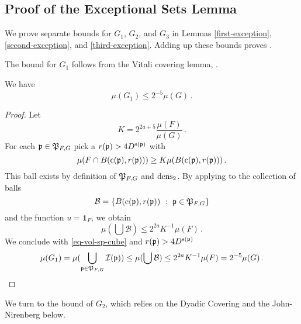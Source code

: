 \subsection{Proof of the Exceptional Sets Lemma}
\label{subsetexcset}


We prove separate bounds for $G_1$, $G_2$, and $G_3$
in Lemmas \ref{first-exception},
\ref{second-exception}, and \ref{third-exception}. Adding up these bounds proves .

The bound for $G_1$ follows from the Vitali covering lemma, .

\begin{lemma}
    \label{first-exception}
    \leanok
    We have
    \begin{equation}
        \mu(G_1)\le 2^{-5}\mu(G)\, .
    \end{equation}
\end{lemma}
\begin{proof}
    \leanok
    Let
    $$
        K = 2^{2a+5}\frac{\mu(F)}{\mu(G)}\,.
    $$
    For each ${\mathfrak p}\in {\mathfrak P}_{F,G}$ pick a
    $r({\mathfrak p})>4D^{{\mathrm{s}}({\mathfrak p})}$ with
    $$
    {\mu(F\cap B({\mathrm{c}}({\mathfrak p}),r({\mathfrak p})))}\ge K{\mu(B({\mathrm{c}}({\mathfrak p}),r({\mathfrak p})))}\, .
    $$
    This ball exists by definition of ${\mathfrak P}_{F,G}$
    and $\operatorname{\operatorname{dens}}_2$. By applying  to the collection of balls
    $$
        \mathcal{B} = \{B(\pc(\fp),r(\fp)) \ : \ \fp \in \fP_{F,G}\}
    $$
    and the function $u = \mathbf{1}_F$, we obtain
    $$
        \mu(\bigcup \mathcal{B}) \le 2^{2a} K^{-1} \mu(F)\,.
    $$
    We conclude with \eqref{eq-vol-sp-cube} and $r({\mathfrak p})>4D^{{\mathrm{s}}({\mathfrak p})}$
    $$
        \mu(G_1)= \mu(\bigcup_{{\mathfrak p}\in {\mathfrak P}_{F,G}} {\mathcal{I}}({\mathfrak p}))
        \le \mu(\bigcup \mathcal{B})\le 2^{2a} K^{-1} \mu (F) = 2^{-5}\mu(G)\,.
    $$
\end{proof}


We turn to the bound of $G_2$, which relies on the Dyadic Covering  and the
John-Nirenberg  below.

